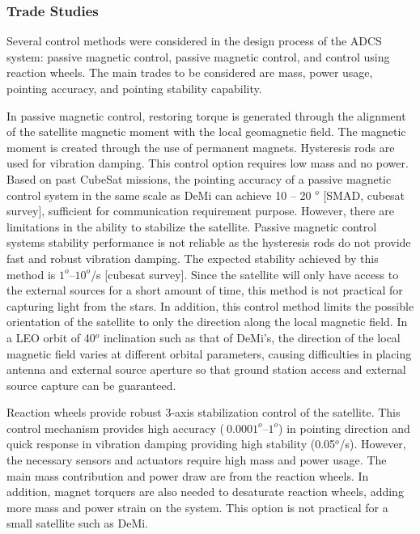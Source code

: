 \documentclass[12pt]{article}
\begin{document}
			\subsubsection{Trade Studies}
			Several control methods were considered in the design process of the ADCS system: passive magnetic control, passive magnetic control, and control using reaction wheels. The main trades to be considered are mass, power usage, pointing accuracy, and pointing stability capability. 

In passive magnetic control, restoring torque is generated through the alignment of the satellite magnetic moment with the local geomagnetic field. The magnetic moment is created through the use of permanent magnets. Hysteresis rods are used for vibration damping. This control option requires low mass and no power. Based on past CubeSat missions, the pointing accuracy of a passive magnetic control system in the same scale as DeMi can achieve 10 – 20 $^o$ [SMAD, cubesat survey], sufficient for communication requirement purpose. However, there are limitations in the ability to stabilize the satellite. Passive magnetic control systems stability performance is not reliable as the hysteresis rods do not provide fast and robust vibration damping. The expected stability achieved by this method is $1^o – 10 ^o$/s [cubesat survey]. Since the satellite will only have access to the external sources for a short amount of time, this method is not practical for capturing light from the stars. In addition, this control method limits the possible orientation of the satellite to only the direction along the local magnetic field. In a LEO orbit of 40$^o$ inclination such as that of DeMi’s, the direction of the local magnetic field varies at different orbital parameters, causing difficulties in placing antenna and external source aperture so that ground station access and external source capture can be guaranteed. 

Reaction wheels provide robust 3-axis stabilization control of the satellite. This control mechanism provides high accuracy ($~ 0.0001^o – 1^o$) in pointing direction and quick response in vibration damping providing high stability (0.05$^o$/s). However, the necessary sensors and actuators require high mass and power usage. The main mass contribution and power draw are from the reaction wheels. In addition, magnet torquers are also needed to desaturate reaction wheels, adding more mass and power strain on the system. This option is not practical for a small satellite such as DeMi. 
\end{document}
